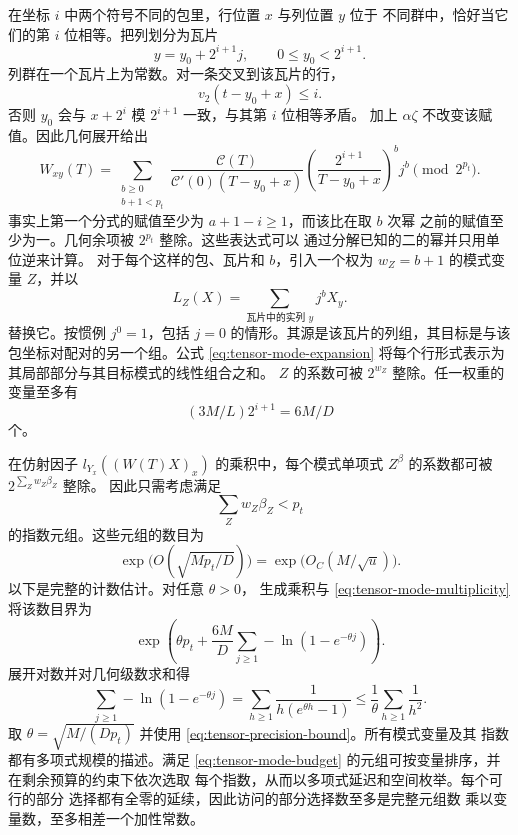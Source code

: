 在坐标 $i$ 中两个符号不同的包里，行位置 $x$ 与列位置 $y$ 位于
不同群中，恰好当它们的第 $i$ 位相等。把列划分为瓦片
\[
 y=y_0+2^{i+1}j,\qquad 0\le y_0<2^{i+1}.
\]
列群在一个瓦片上为常数。对一条交叉到该瓦片的行，
\[
 v_2(t-y_0+x)\le i.
\]
否则 $y_0$ 会与 $x+2^i$ 模 $2^{i+1}$ 一致，与其第 $i$ 位相等矛盾。
加上 $\alpha\zeta$ 不改变该赋值。因此几何展开给出
\begin{equation}\label{eq:tensor-mode-expansion}
 W_{xy}(T)=
 \sum_{\substack{b\ge0\\b+1<p_t}}
 \frac{\mathcal C(T)}
      {\mathcal C'(0)(T-y_0+x)}
 \left(\frac{2^{i+1}}{T-y_0+x}\right)^b j^b
 \pmod {2^{p_t}}.
\end{equation}
事实上第一个分式的赋值至少为 $a+1-i\ge1$，而该比在取 $b$ 次幂
之前的赋值至少为一。几何余项被 $2^{p_t}$ 整除。这些表达式可以
通过分解已知的二的幂并只用单位逆来计算。
对于每个这样的包、瓦片和 $b$，引入一个权为 $w_Z=b+1$ 的模式变量 $Z$，并以
\[
 L_Z(X)=\sum_{\text{瓦片中的实列 }y}j^bX_y.
\]
替换它。按惯例 $j^0=1$，包括 $j=0$ 的情形。其源是该瓦片的列组，其目标是与该包坐标对配对的另一个组。公式
\eqref{eq:tensor-mode-expansion} 将每个行形式表示为其局部部分与其目标模式的线性组合之和。
$Z$ 的系数可被 $2^{w_Z}$ 整除。任一权重的变量至多有
\begin{equation}\label{eq:tensor-mode-multiplicity}
 (3M/L)2^{i+1}=6M/D
\end{equation}
个。

在仿射因子
$l_{Y_x}((W(T)X)_x)$ 的乘积中，每个模式单项式
$Z^\beta$ 的系数都可被 $2^{\sum_Zw_Z\beta_Z}$ 整除。
因此只需考虑满足
\begin{equation}\label{eq:tensor-mode-budget}
 \sum_Zw_Z\beta_Z<p_t
\end{equation}
的指数元组。这些元组的数目为
\begin{equation}\label{eq:tensor-partition-count}
 \exp\bigl(O(\sqrt{Mp_t/D})\bigr)
       =\exp\bigl(O_C(M/\sqrt u)\bigr).
\end{equation}
以下是完整的计数估计。对任意 $\theta>0$，
生成乘积与 \eqref{eq:tensor-mode-multiplicity} 将该数目界为
\[
 \exp\left(\theta p_t+\frac{6M}{D}
                   \sum_{j\ge1}-\ln(1-e^{-\theta j})\right).
\]
展开对数并对几何级数求和得
\[
 \sum_{j\ge1}-\ln(1-e^{-\theta j})
  =\sum_{h\ge1}\frac1{h(e^{\theta h}-1)}
  \le\frac1\theta\sum_{h\ge1}\frac1{h^2}.
\]
取 $\theta=\sqrt{M/(Dp_t)}$ 并使用
\eqref{eq:tensor-precision-bound}。所有模式变量及其
指数都有多项式规模的描述。满足
\eqref{eq:tensor-mode-budget} 的元组可按变量排序，并在剩余预算的约束下依次选取
每个指数，从而以多项式延迟和空间枚举。每个可行的部分
选择都有全零的延续，因此访问的部分选择数至多是完整元组数
乘以变量数，至多相差一个加性常数。

